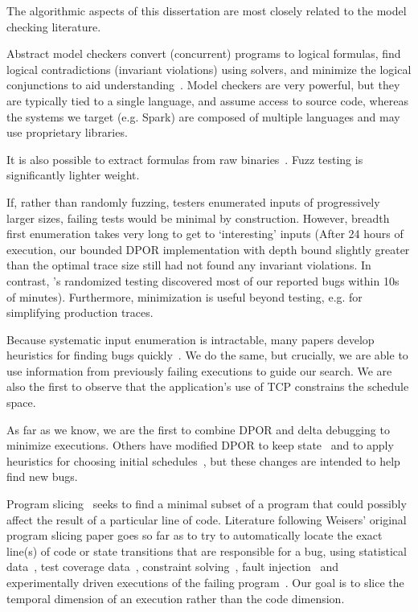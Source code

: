  The algorithmic aspects of this
dissertation are most closely
related to the model checking literature.

Abstract model checkers convert (concurrent) programs to logical formulas, find
logical contradictions (invariant violations) using solvers, and minimize the logical
conjunctions to aid
understanding~\cite{christ2013flow,khoshnood2015concbugassist,machado2015concurrency}.
Model checkers are very powerful, but they are typically tied to a single
language, and assume access to source code, whereas the systems we target (e.g.
Spark) are composed of multiple languages and may use proprietary
libraries.

It is also possible to extract formulas from raw binaries~\cite{avgerinos2014enhancing}.
Fuzz testing is significantly lighter weight.

If, rather than randomly fuzzing, testers
enumerated inputs of progressively larger sizes, failing tests would
be minimal by construction. However, breadth first enumeration takes very long to get to
`interesting' inputs (After 24 hours of execution, our bounded DPOR
implementation with depth bound slightly greater than the optimal trace size still had not found any invariant violations. In
contrast, \sys's randomized testing discovered
most of our reported bugs within 10s of minutes).
Furthermore, minimization is
useful beyond testing, e.g. for simplifying production traces.

Because systematic input enumeration is intractable, many papers
develop heuristics for finding bugs
quickly~\cite{tzoref2007instrumenting,musuvathi2007iterative,musuvathi2008finding,yabandeh2009crystalball,burckhardt2010randomized,terragnirecontest,fonseca2014ski,leesatapornwongsa2014samc,lin2009modist,park2009ctrigger,coons2010gambit}.
We do the same, but crucially, we are able to use
information from previously failing executions to guide our search.
We are also the first to observe that the
application's use
of TCP constrains the schedule space.

As far as we know, we are the first to combine DPOR and delta debugging to
minimize executions. Others have modified DPOR to keep state~\cite{yang2008efficient,yi2006stateful}
and to apply heuristics for choosing initial schedules~\cite{lauterburg2010evaluating}, but these
changes are intended to help find new bugs.

 Program slicing~\cite{weiser1981program}
seeks to find a minimal subset of a program that could possibly affect the result of a particular line of code.
Literature following Weisers' original program
slicing paper goes so far as to try to
automatically locate the exact line(s) of code or state transitions that are responsible for a
bug, using statistical data~\cite{zhangzhang}, test coverage
data~\cite{coverage_localization,xuan14}, constraint solving~\cite{jose11},
fault injection~\cite{zhang13} and
experimentally driven executions of the failing program~\cite{zeller2005,comparative_causality}.
Our goal is to slice the temporal dimension of an execution rather than the
code dimension.

